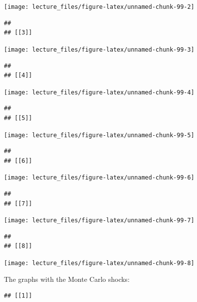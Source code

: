 \documentclass[
]{book}
\begin{document}
\begin{center}\texttt{[image: lecture\_files/figure-latex/unnamed-chunk-99-2]} \end{center}

\begin{verbatim}
## 
## [[3]]
\end{verbatim}

\begin{center}\texttt{[image: lecture\_files/figure-latex/unnamed-chunk-99-3]} \end{center}

\begin{verbatim}
## 
## [[4]]
\end{verbatim}

\begin{center}\texttt{[image: lecture\_files/figure-latex/unnamed-chunk-99-4]} \end{center}

\begin{verbatim}
## 
## [[5]]
\end{verbatim}

\begin{center}\texttt{[image: lecture\_files/figure-latex/unnamed-chunk-99-5]} \end{center}

\begin{verbatim}
## 
## [[6]]
\end{verbatim}

\begin{center}\texttt{[image: lecture\_files/figure-latex/unnamed-chunk-99-6]} \end{center}

\begin{verbatim}
## 
## [[7]]
\end{verbatim}

\begin{center}\texttt{[image: lecture\_files/figure-latex/unnamed-chunk-99-7]} \end{center}

\begin{verbatim}
## 
## [[8]]
\end{verbatim}

\begin{center}\texttt{[image: lecture\_files/figure-latex/unnamed-chunk-99-8]} \end{center}

The graphs with the Monte Carlo shocks:

\begin{verbatim}
## [[1]]
\end{verbatim}
\end{document}
